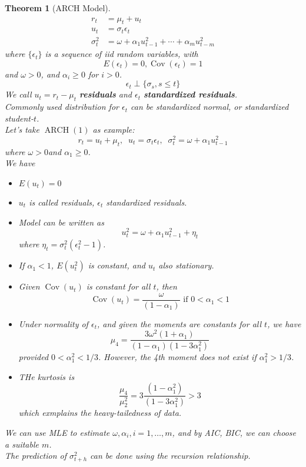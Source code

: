 \documentclass[12pt]{article}
\newtheorem{theorem}{Theorem}[section]
\theoremstyle{definition}
\DeclareMathOperator{\cov}{Cov}
\DeclareMathOperator{\ARCH}{ARCH}
\begin{document}
\begin{theorem}[ARCH Model]
\hfill\\\normalfont 
\begin{align*}
r_t &= \mu_t + u_t\\
u_t &=\sigma_t\epsilon_t\\
\sigma_t^2 &=\omega + \alpha_1u_{t-1}^2 +\cdots + \alpha_mu_{t-m}^2
\end{align*}
where $\{\epsilon_t\}$ is a sequence of iid random variables, with
\[
E(\epsilon_t) = 0, \cov(\epsilon_t) = 1
\]
and $\omega>0$, and $\alpha_i\geq 0$ for $i>0$.
\[
\epsilon_t \perp \{\sigma_s, s\leq t\}
\]
We call $u_t=r_t-\mu_t$ \textbf{residuals} and $\epsilon_t$ \textbf{standardized residuals}.\\
Commonly used distribution for $\epsilon_t$ can be standardized normal, or standardized student-$t$.\\
Let's take $\ARCH(1)$ as example:
\[
r_t = u_t + \mu_t,\;\; u_t=\sigma_t\epsilon_t,\;\;\sigma_t^2 = \omega + \alpha_1u_{t-1}^2
\]
where $\omega>0$and $\alpha_1\geq 0$.\\
We have
\begin{itemize}
  \item $E(u_t) = 0$
  \item $u_t$ is called residuals, $\epsilon_t$ standardized residuals.
  \item Model can be written as
  \[
u_t^2 = \omega + \alpha_1 u_{t-1}^2 + \eta_t
  \]
where $\eta_t = \sigma_t^2(\epsilon_t^2 - 1)$.
  \item If $\alpha_1<1$, $E(u_t^2)$ is constant, and $u_t$ also stationary.
  \item Given $\cov(u_t)$ is constant for all $t$, then
  \[
\cov(u_t) = \frac{\omega}{(1-\alpha_1)}\text{ if } 0 < \alpha_1 < 1
  \] 
  \item Under normality of $\epsilon_t$, and given the moments are constants for all $t$, we have
  \[
\mu_4 = \frac{3\omega^2(1+\alpha_1)}{(1-\alpha_1)(1-3\alpha_1^2)}
  \]
provided $0<\alpha_1^2<1/3$. However, the 4th moment does not exist if $\alpha_1^2>1/3$.
  \item THe kurtosis is
  \[
\frac{\mu_4}{\mu_2^2} = 3\frac{(1-\alpha_1^2)}{(1-3\alpha_1^2)}>3
  \]
  which exmplains the heavy-tailedness of data.
\end{itemize}
We can use MLE to estimate $\omega, \alpha_i, i = 1,\ldots, m$, and by AIC, BIC, we can choose a suitable $m$.\\
The prediction of $\sigma_{t+h}^2$ can be done using the recursion relationship. 
\end{theorem}
\end{document}
